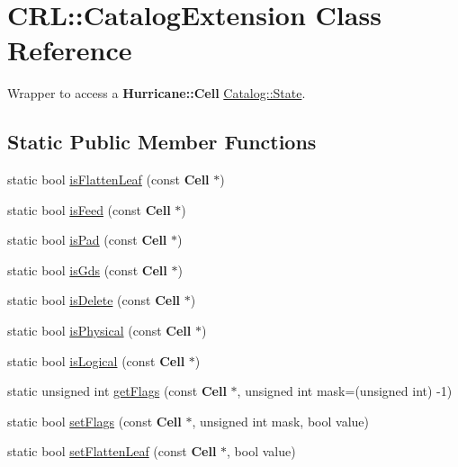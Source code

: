 \hypertarget{classCRL_1_1CatalogExtension}{}\section{C\+RL\+:\+:Catalog\+Extension Class Reference}
\label{classCRL_1_1CatalogExtension}


Wrapper to access a \textbf{ Hurricane\+::\+Cell} \hyperlink{classCRL_1_1Catalog_1_1State}{Catalog\+::\+State}.  


\subsection*{Static Public Member Functions}
\begin{DoxyCompactItemize}
\item 
static bool \hyperlink{classCRL_1_1CatalogExtension_af6487fb6007e34163773d8e8d15013a1}{is\+Flatten\+Leaf} (const \textbf{ Cell} $\ast$)
\item 
static bool \hyperlink{classCRL_1_1CatalogExtension_a5feda5d6fba490a71e3742361ec7b4a1}{is\+Feed} (const \textbf{ Cell} $\ast$)
\item 
static bool \hyperlink{classCRL_1_1CatalogExtension_a2695acabeac2f224fa4ac3a9563aeee9}{is\+Pad} (const \textbf{ Cell} $\ast$)
\item 
static bool \hyperlink{classCRL_1_1CatalogExtension_a37c8d304e7386ee31b73c826cb929e5f}{is\+Gds} (const \textbf{ Cell} $\ast$)
\item 
static bool \hyperlink{classCRL_1_1CatalogExtension_a90e941d2349f5a0f4f7fefb41b434b0a}{is\+Delete} (const \textbf{ Cell} $\ast$)
\item 
static bool \hyperlink{classCRL_1_1CatalogExtension_a3af53ef4a7fa512a079adbcb68677e2f}{is\+Physical} (const \textbf{ Cell} $\ast$)
\item 
static bool \hyperlink{classCRL_1_1CatalogExtension_a558c506a28d2230e592080dccbcca380}{is\+Logical} (const \textbf{ Cell} $\ast$)
\item 
static unsigned int \hyperlink{classCRL_1_1CatalogExtension_a9525c2253aa310a63de32caaeb694e66}{get\+Flags} (const \textbf{ Cell} $\ast$, unsigned int mask=(unsigned int) -\/1)
\item 
static bool \hyperlink{classCRL_1_1CatalogExtension_ab9475735032d500f4d4a8cf980864b3e}{set\+Flags} (const \textbf{ Cell} $\ast$, unsigned int mask, bool value)
\item 
static bool \hyperlink{classCRL_1_1CatalogExtension_a00772e9c455d0e44caf132ee724b958d}{set\+Flatten\+Leaf} (const \textbf{ Cell} $\ast$, bool value)

\end{DoxyCompactItemize}
